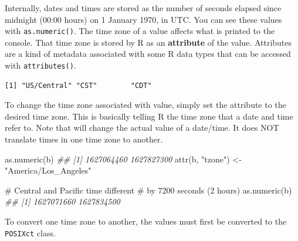 \documentclass[
  13,
  letterpaper,
]{report}
\newenvironment{Shaded}{\begin{snugshade}}{\end{snugshade}}
\newcommand{\CommentTok}[1]{\textcolor[rgb]{0.37,0.37,0.37}{#1}}
\newcommand{\DocumentationTok}[1]{\textcolor[rgb]{0.37,0.37,0.37}{\textit{#1}}}
\newcommand{\FunctionTok}[1]{\textcolor[rgb]{0.28,0.35,0.67}{#1}}
\newcommand{\NormalTok}[1]{\textcolor[rgb]{0.00,0.23,0.31}{#1}}
\newcommand{\OtherTok}[1]{\textcolor[rgb]{0.00,0.23,0.31}{#1}}
\newcommand{\SpecialCharTok}[1]{\textcolor[rgb]{0.37,0.37,0.37}{#1}}
\newcommand{\StringTok}[1]{\textcolor[rgb]{0.13,0.47,0.30}{#1}}
\begin{document}
Internally, dates and times are stored as the number of seconds elapsed
since midnight (00:00 hours) on 1 January 1970, in UTC. You can see
these values with \texttt{as.numeric()}. The time zone of a value
affects what is printed to the console. That time zone is stored by R as
an \textbf{attribute} of the value. Attributes are a kind of metadata
associated with some R data types that can be accessed with
\texttt{attributes()}.

\begin{Shaded}
\end{Shaded}

\begin{verbatim}
[1] "US/Central" "CST"        "CDT"       
\end{verbatim}

To change the time zone associated with value, simply set the attribute
to the desired time zone. This is basically telling R the time zone that
a date and time refer to. Note that will change the actual value of a
date/time. It does NOT translate times in one time zone to another.

\begin{Shaded}
\begin{Highlighting}[]

\FunctionTok{as.numeric}\NormalTok{(b)}
\DocumentationTok{\#\# [1] 1627064460 1627827300}
\FunctionTok{attr}\NormalTok{(b, }\StringTok{"tzone"}\NormalTok{) }\OtherTok{\textless{}{-}} \StringTok{"America/Los\_Angeles"}

\CommentTok{\# Central and Pacific time different}
\CommentTok{\# by 7200 seconds (2 hours)}
\FunctionTok{as.numeric}\NormalTok{(b)}
\DocumentationTok{\#\# [1] 1627071660 1627834500}
\end{Highlighting}
\end{Shaded}

To convert one time zone to another, the values must first be converted
to the \texttt{POSIXct} class.
\end{document}
